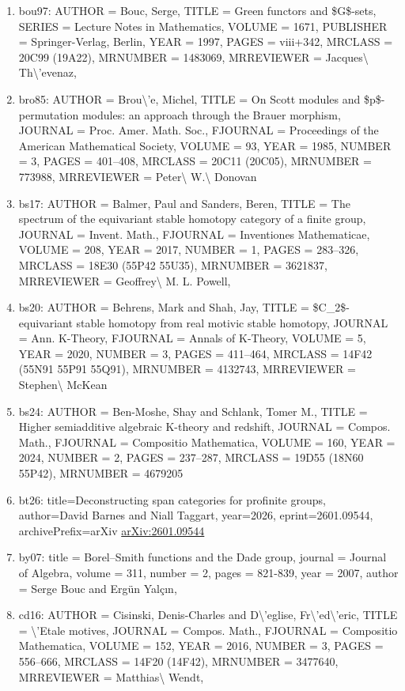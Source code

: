 \documentclass[11pt]{article}
\begin{document}
\begin{enumerate}[leftmargin=*]
  \item bou97: AUTHOR = Bouc, Serge, TITLE = Green functors and \$G\$-sets, SERIES = Lecture Notes in Mathematics, VOLUME = 1671, PUBLISHER = Springer-Verlag, Berlin, YEAR = 1997, PAGES = viii+342, MRCLASS = 20C99 (19A22), MRNUMBER = 1483069, MRREVIEWER = Jacques\textbackslash{} Th\textbackslash{}'evenaz,
  \item bro85: AUTHOR = Brou\textbackslash{}'e, Michel, TITLE = On Scott modules and \$p\$-permutation modules: an approach through the Brauer morphism, JOURNAL = Proc. Amer. Math. Soc., FJOURNAL = Proceedings of the American Mathematical Society, VOLUME = 93, YEAR = 1985, NUMBER = 3, PAGES = 401--408, MRCLASS = 20C11 (20C05), MRNUMBER = 773988, MRREVIEWER = Peter\textbackslash{} W.\textbackslash{} Donovan
  \item bs17: AUTHOR = Balmer, Paul and Sanders, Beren, TITLE = The spectrum of the equivariant stable homotopy category of a finite group, JOURNAL = Invent. Math., FJOURNAL = Inventiones Mathematicae, VOLUME = 208, YEAR = 2017, NUMBER = 1, PAGES = 283--326, MRCLASS = 18E30 (55P42 55U35), MRNUMBER = 3621837, MRREVIEWER = Geoffrey\textbackslash{} M. L. Powell,
  \item bs20: AUTHOR = Behrens, Mark and Shah, Jay, TITLE = \$C\_2\$-equivariant stable homotopy from real motivic stable homotopy, JOURNAL = Ann. K-Theory, FJOURNAL = Annals of K-Theory, VOLUME = 5, YEAR = 2020, NUMBER = 3, PAGES = 411--464, MRCLASS = 14F42 (55N91 55P91 55Q91), MRNUMBER = 4132743, MRREVIEWER = Stephen\textbackslash{} McKean
  \item bs24: AUTHOR = Ben-Moshe, Shay and Schlank, Tomer M., TITLE = Higher semiadditive algebraic K-theory and redshift, JOURNAL = Compos. Math., FJOURNAL = Compositio Mathematica, VOLUME = 160, YEAR = 2024, NUMBER = 2, PAGES = 237--287, MRCLASS = 19D55 (18N60 55P42), MRNUMBER = 4679205
  \item bt26: title=Deconstructing span categories for profinite groups, author=David Barnes and Niall Taggart, year=2026, eprint=2601.09544, archivePrefix=arXiv \href{https://arxiv.org/abs/2601.09544}{arXiv:2601.09544}
  \item by07: title = Borel--Smith functions and the Dade group, journal = Journal of Algebra, volume = 311, number = 2, pages = 821-839, year = 2007, author = Serge Bouc and Ergün Yalçın,
  \item cd16: AUTHOR = Cisinski, Denis-Charles and D\textbackslash{}'eglise, Fr\textbackslash{}'ed\textbackslash{}'eric, TITLE = \textbackslash{}'Etale motives, JOURNAL = Compos. Math., FJOURNAL = Compositio Mathematica, VOLUME = 152, YEAR = 2016, NUMBER = 3, PAGES = 556--666, MRCLASS = 14F20 (14F42), MRNUMBER = 3477640, MRREVIEWER = Matthias\textbackslash{} Wendt,

\end{enumerate}
\end{document}
